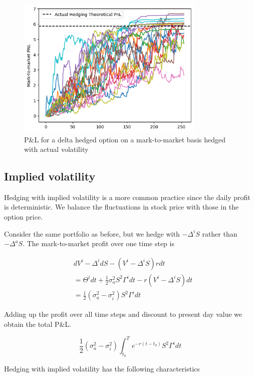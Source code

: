 \documentclass{article}
\newcommand{\para}{\vspace{8pt}} %
\begin{document}
 
\begin{figure}[h]
\centering
\includegraphics[width=0.8\textwidth]{images/actual_volatility_hedging.png}
\caption{P\&L for a delta hedged option on a mark-to-market basis hedged with actual volatility}
\label{fig:actual_volatility_hedging}
\end{figure}

\subsection{Implied volatility}

Hedging with implied volatility is a more common practice since the daily profit is deterministic. We balance the fluctuations in stock price with those in the option price.

\para
Consider the same portfolio as before, but we hedge with $-\Delta^i S$ rather than $-\Delta^a S$. The mark-to-market profit over one time step is

\begin{center}
\begin{align*}
& dV^i - \Delta^i dS -(V^i - \Delta^i S) rdt\\[2pt]
&= \Theta^i dt + \frac{1}{2} \sigma_a^2 S^2 \Gamma^i dt - r(V^i - \Delta^i S) dt\\[2pt]
&= \frac{1}{2}(\sigma_a^2 - \sigma_i^2) S^2 \Gamma^i dt
\end{align*}
\end{center}

Adding up the profit over all time steps and discount to present day value we obtain the total P\&L.

\[
    \frac{1}{2}(\sigma_a^2 - \sigma_i^2) \int_{t_0}^{T} e^{-r(t-t_0)} S^2 \Gamma^i dt
\]

Hedging with implied volatility has the following characteristics 
\end{document}
